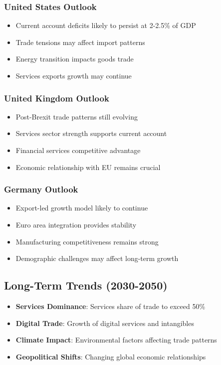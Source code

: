 \documentclass[11pt,a4paper]{article}
\begin{document}
\subsubsection{United States Outlook}
\begin{itemize}
    \item Current account deficits likely to persist at 2-2.5\% of GDP
    \item Trade tensions may affect import patterns
    \item Energy transition impacts goods trade
    \item Services exports growth may continue
\end{itemize}

\subsubsection{United Kingdom Outlook}
\begin{itemize}
    \item Post-Brexit trade patterns still evolving
    \item Services sector strength supports current account
    \item Financial services competitive advantage
    \item Economic relationship with EU remains crucial
\end{itemize}

\subsubsection{Germany Outlook}
\begin{itemize}
    \item Export-led growth model likely to continue
    \item Euro area integration provides stability
    \item Manufacturing competitiveness remains strong
    \item Demographic challenges may affect long-term growth
\end{itemize}

\subsection{Long-Term Trends (2030-2050)}
\begin{itemize}
    \item \textbf{Services Dominance}: Services share of trade to exceed 50\%
    \item \textbf{Digital Trade}: Growth of digital services and intangibles
    \item \textbf{Climate Impact}: Environmental factors affecting trade patterns
    \item \textbf{Geopolitical Shifts}: Changing global economic relationships
\end{itemize}
\end{document}
